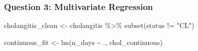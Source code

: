 \documentclass[
]{article}
\newenvironment{Shaded}{\begin{snugshade}}{\end{snugshade}}
\newcommand{\FunctionTok}[1]{\textcolor[rgb]{0.00,0.00,0.00}{#1}}
\newcommand{\NormalTok}[1]{#1}
\newcommand{\OtherTok}[1]{\textcolor[rgb]{0.56,0.35,0.01}{#1}}
\newcommand{\SpecialCharTok}[1]{\textcolor[rgb]{0.00,0.00,0.00}{#1}}
\newcommand{\StringTok}[1]{\textcolor[rgb]{0.31,0.60,0.02}{#1}}
\begin{document}
\hypertarget{question-3-multivariate-regression}{%
\subsubsection{Question 3: Multivariate
Regression}\label{question-3-multivariate-regression}}

\begin{Shaded}
\begin{Highlighting}[]
\NormalTok{cholangitis\_clean }\OtherTok{\textless{}{-}}\NormalTok{ cholangitis }\SpecialCharTok{\%\textgreater{}\%} 
  \FunctionTok{subset}\NormalTok{(status }\SpecialCharTok{!=} \StringTok{"CL"}\NormalTok{)}
\end{Highlighting}
\end{Shaded}

\begin{Shaded}
\begin{Highlighting}[]
\NormalTok{continuous\_fit }\OtherTok{\textless{}{-}} \FunctionTok{lm}\NormalTok{(n\_days }\SpecialCharTok{\textasciitilde{}}\NormalTok{ ., chol\_continuous)}
\end{Highlighting}
\end{Shaded}
\end{document}
